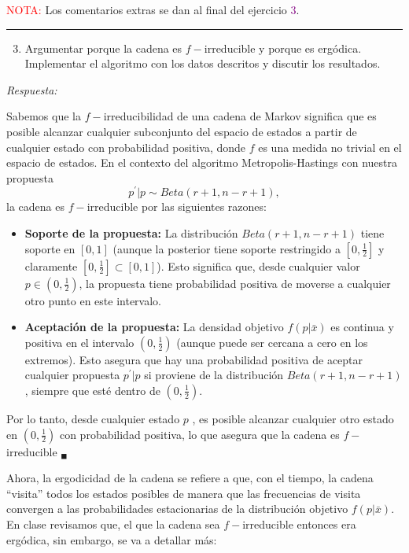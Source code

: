 \textcolor{red}{NOTA:} Los comentarios extras se dan al final del ejercicio \textcolor{Purple}{3}.

\vspace{5mm}
{\color{lightgray} \hrule}
\begin{enumerate} \setcounter{enumi}{2}
	\item Argumentar porque la cadena es $f-$irreducible y porque es ergódica. Implementar el algoritmo con los datos descritos y discutir los resultados.
\end{enumerate}

\textcolor{BrickRed}{\it Respuesta:}

Sabemos que la $f-$irreducibilidad de una cadena de Markov significa que es posible alcanzar cualquier subconjunto del espacio de estados a partir de cualquier estado con probabilidad positiva, donde  $f$  es una medida no trivial en el espacio de estados. En el contexto del algoritmo Metropolis-Hastings con nuestra propuesta
\begin{equation}
	 p^{'} | p \sim Beta(r+1, n-r+1), 
\end{equation}
la cadena es  $f-$irreducible por las siguientes razones:
\begin{itemize}
	\item \textbf{Soporte de la propuesta:} La distribución $Beta(r+1, n-r+1)$ tiene soporte en $[0, 1]$  (aunque la posterior tiene soporte restringido a $[0, \frac{1}{2}]$ y claramente $[0, \frac{1}{2}] \subset [0, 1]$). Esto significa que, desde cualquier valor  $p \in (0, \frac{1}{2})$, la propuesta tiene probabilidad positiva de moverse a cualquier otro punto en este intervalo.
	
	\item \textbf{Aceptación de la propuesta:} La densidad objetivo $f(p|\bar{x})$ es continua y positiva en el intervalo $(0, \frac{1}{2})$ (aunque puede ser cercana a cero en los extremos). Esto asegura que hay una probabilidad positiva de aceptar cualquier propuesta $p^{'} | p$ si proviene de la distribución $Beta(r+1, n-r+1)$, siempre que esté dentro de $(0, \frac{1}{2})$.
\end{itemize}

Por lo tanto, desde cualquier estado $p$ , es posible alcanzar cualquier otro estado en $(0, \frac{1}{2})$ con probabilidad positiva, lo que asegura que la cadena es  $f-$irreducible $_\blacksquare$

Ahora, la ergodicidad de la cadena se refiere a que, con el tiempo, la cadena “visita” todos los estados posibles de manera que las frecuencias de visita convergen a las probabilidades estacionarias de la distribución objetivo $f(p|\bar{x})$. En clase revisamos que, el que la cadena sea $f-$irreducible entonces era ergódica, sin embargo, se va a detallar más:

